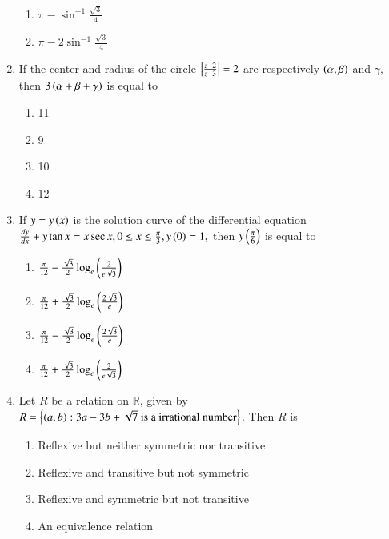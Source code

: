\documentclass[journal]{IEEEtran}
\begin{document}
\begin{enumerate}
\begin{multicols}{2}
\begin{enumerate}
\item $\pi-\sin^{-1}\frac{\sqrt 3}{4}$
\item $\pi-2\sin^{-1}\frac{\sqrt 3}{4}$
\end{enumerate}
\end{multicols}
\item If the center and radius of the circle $\left\vert\frac{z-2}{z-3}\right\vert=2$ are respectively $\left(\alpha ,\beta\right)$ and $\gamma$, then $3\left(\alpha +\beta +\gamma\right)$ is equal to 
\begin{multicols}{2}
\begin{enumerate}
\item 11
\item 9
\item 10
\item 12
\end{enumerate}
\end{multicols}
\item If $y=y\left(x\right)$ is the solution curve of the differential equation $\frac{dy}{dx}+y\tan{x}=x\sec{x}, 0\le x\le \frac{\pi}{3},y\left(0\right)=1,$ then $y\left(\frac{\pi}{6}\right)$  is equal to
\begin{enumerate}
\item $\frac{\pi}{12}-\frac{\sqrt 3}{2}\log_e\left(\frac{2}{e\sqrt 3}\right)$
\item $\frac{\pi}{12}+\frac{\sqrt 3}{2}\log_e\left(\frac{2\sqrt 3}{e}\right)$
\item $\frac{\pi}{12}-\frac{\sqrt 3}{2}\log_e\left(\frac{2\sqrt 3}{e}\right)$
\item $\frac{\pi}{12}+\frac{\sqrt 3}{2}\log_e\left(\frac{2}{e\sqrt 3}\right)$
\end{enumerate}
\item Let $R$ be a relation on $\mathbb{R}$, given by $R=\left\{ \left(a,b\right): 3a-3b+\sqrt{7} \text { is a irrational number}\right\}$. Then $R$ is 
\begin{enumerate}
\item Reflexive but neither symmetric nor transitive
\item Reflexive and transitive but not symmetric
\item Reflexive and symmetric but not transitive
\item An equivalence relation
\end{enumerate}	
\end{enumerate}
\end{document}
